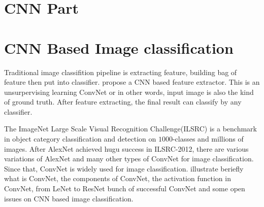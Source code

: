 \documentclass[10pt,twocolumn,letterpaper]{article}
\begin{document}
\section{CNN Part}

\section{CNN Based Image classification}
Traditional image classifition pipeline is extracting feature, building bag of feature then put into classifier. \cite{} propose a CNN based feature extractor. This is an unsurpervising learning ConvNet or in other words, input image is also the kind of ground truth. After feature extracting, the final result can classify by any classifier.
\par
The ImageNet Large Scale Visual Recognition Challenge(ILSRC) is a benchmark in object category classification and detection on $1000$-classes and millions of images. After AlexNet achieved hugu success in ILSRC-2012, there are various variations of AlexNet\cite{} and many other types of ConvNet for image classification. Since that, ConvNet is widely used for image classification. \cite{review} illustrate beriefly what is ConvNet, the components of ConvNet, the activation function in ConvNet, from LeNet to ResNet bunch of successful ConvNet and some open issues on CNN based image classification.
\end{document}
